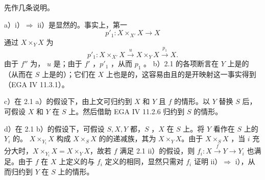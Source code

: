 先作几条说明。

 a）i）$\Rightarrow$ ii）是显然的。事实上，第一
\[p'_1:X\times_{X'}X\longrightarrow X\]
通过 $X\times_Y X$ 为
\[p'_1:X\times_{X'}X\xrightarrow{u}X\times_Y X\xrightarrow{p_1}X.\]
由于 $f''$ 为， $u$ 是；由于 $f'$ ，$p'_1$ ，从而 $p_1$ 。
 b）2.1 的各项断言在 $Y$ 上是的（从而在 $S$ 上是的）；它们在 $X$ 上也是的，这容易由且的是开映射这一事实得到（EGA IV 11.3.1）。

 c）在 2.1 a）的假设下，由上文可归约到 $X$ 和 $Y$ 且 $f$ 的情形。以 $Y$ 替换 $S$ 后，可假设 $X$ 和 $Y$ 在 $S$ 上。然后借助 EGA IV 11.2.6 归约到 $S$ 的情形。

 d）在 2.1 b）的假设下，可假设 $S,X,Y$ 都，$S$ ，$X$ 在 $S$ 上。将 $Y$ 看作在 $S$ 上的 $Y_i$ 的。 $X\times_{Y_i}X$ 构成 $X\times_S X$ 的的递减族，其为 $X\times_Y X$。由于 $X\times_S X$ ，当 $i$ 充分大时，$X\times_{Y_i}X=X\times_Y X$，故若 $f$ 满足 2.1 ii）的假设，则 $f_i:X\xrightarrow{f}Y\to Y_i$ 也满足。由于 $f$ 在 $X$ 上定义的与 $f_i$ 定义的相同，显然只需对 $f_i$ 证明 ii）$\Rightarrow$ i），从而归约到 $Y$ 在 $S$ 上的情形。

